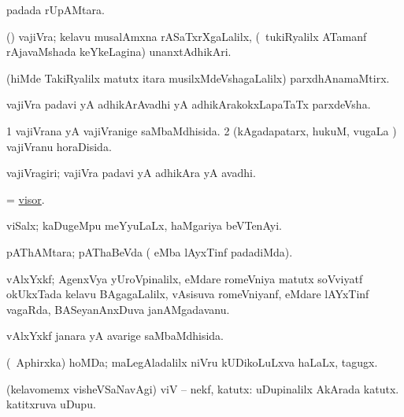 \bentry
{} 
\gl{\nA}
\expl{}
\bmng
  padada rUpAMtara. 
\emng
\eentry

\bentry 
{} 
\gl{\nA}
\expl{}
\bmng
 (\ca) vajiVra; kelavu musalAmxna rASaTxrXgaLalilx, (\kanmu\ tukiRyalilx ATamanf rAjavaMshada keYkeLagina) unanxtAdhikAri. 
\emng

\noindent 
\gl{\pagu}
\expl{}
\bmng
  (hiMde TakiRyalilx matutx itara musilxMdeVshagaLalilx) parxdhAnamaMtirx. 
\emng
\eentry

\bentry 
{} 
\gl{\nA}
\expl{}
\bmng
 vajiVra padavi yA adhikArAvadhi yA adhikArakokxLapaTaTx parxdeVsha. 
\emng
\eentry

\bentry
{} 
\gl{\gu}
\expl{}
\bmng
\bnum
\num{1} vajiVrana yA vajiVranige saMbaMdhisida. 
\num{2} (kAgadapatarx, hukuM, \mo vugaLa \vi) vajiVranu horaDisida. 
\enum
\emng
\eentry

\bentry
{} 
\gl{\nA}
\expl{}
\bmng
 vajiVragiri; vajiVra padavi yA adhikAra yA avadhi. 
\emng
\eentry

\bentry 
{} 
\gl{\nA}
\expl{}
\bmng
= \hyperlink{visor}{visor}. 
\emng
\eentry

\bentry
{} 
\gl{\nA}
\expl{}
\bmng
 viSalx; kaDugeMpu meYyuLaLx, haMgariya beVTenAyi. 
\emng
\eentry

\bentry 
{} 
\gl{\saMkiSx}
\expl{}
\bmng
 pAThAMtara; pAThaBeVda ( eMba lAyxTinf padadiMda). 
\emng
\eentry

\bentry
{} 
\gl{\nA}
\expl{}
\bmng
 vAlxYxkf; AgenxVya yUroVpinalilx, eMdare romeVniya matutx soVviyatf okUkxTada kelavu BAgagaLalilx, vAsisuva romeVniyanf, eMdare lAYxTinf vagaRda, BASeyanAnxDuva janAMgadavanu. 
\emng
\eentry

\bentry 
{} 
\gl{\gu}
\expl{}
\bmng
 vAlxYxkf janara yA avarige saMbaMdhisida. 
\emng
\eentry

\bentry 
{} 
\gl{\nA}
\expl{}
\bmng
 (\da\ Aphirxka) hoMDa; maLegAladalilx niVru kUDikoLuLxva haLaLx, tagugx. 
\emng
\eentry

\bentry
{}
\gl{\nA}
\expl{}
\bmng
(kelavomemx visheVSaNavAgi) viV -- nekf, katutx: 
\banum
{} uDupinalilx  AkArada katutx. 
  katitxruva uDupu. 
\eanum
\emng
\eentry


